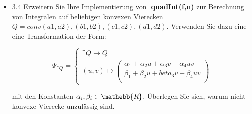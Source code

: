 \documentclass[a4paper,11pt,bibliography=totoc,listof=totoc,headinclude=true,cleardoublepage=empty,oneside]{scrbook}
\begin{document}
{\begin{itemize}
		Sei nun $ p \in \prod_{2}^k \Rightarrow \int_{\^{T}}^{} p(x,y)d(x,y) = 
		\int_{\^{Q}}^{} p(\Phi(x),\Phi(y)) * det|d\Phi| d(s,t)$ .
		
		Für $p=x^iy^j"$ lautet die Transformation wie folgt:
		
		$p(\Phi(x),\Phi(y)) = (\alpha_1+s\alpha_2+t\alpha_3+st\alpha_4)^i(\beta_1+s\beta_2+t\beta_3+st\beta_4)^j$.
			
			Aus diesem Ausdruck lesen wir heraus dass der höchste Term 
			
			$\delta_0s^it^is^jt^j = s^(i+j)t^(i+j)\delta_0$
			
			mit einer Konstanten $\delta_0$ die in diesem Fall vernachlässigt werden kann.
			
			Hingegen ist der höchste Term der Funktionaldeterminante $det|D\Phi|$:
			
			$\delta_1st$
			KORRIGIEREN, schöner SCHREIBEN
			WO FEHLT OBEN DIE TRANSFORMATION BEI DER DIE FUNKTIONALDETERMINANTE NOCH ANGEHÄNGT WERDEN MUSS
			
			Somit ist der größte Term von
			 $\int_{\^{Q}}^{} p(\Phi(x),\Phi(y)) * det|d\Phi| d(s,t)$ 
			 vom Grad
			 $\deltas^{i+j+1}t^{i+j+1}$.
			 Da $i+j+1\leq2n+1$ gefordert wird, ergibt sich $i+j\leq2n$.
			 			
			
		

		
		\item 3.4 Erweitern Sie Ihre Implementierung von \textbf{[quadInt(f,n)} zur Berechnung von Integralen auf beliebigen konvexen Vierecken $ Q=conv{(a1,a2),(b1,b2),(c1,c2),(d1,d2)} $. Verwenden Sie dazu eine eine Transformation der Form:
		
			\begin{equation} 
			\Psi_{\^{Q}} = \begin{cases} 
			\^{Q} \to Q \\
			(u,v) \mapsto
			
		 \left(
		  \begin{array}{ccc}
		  \alpha_1 + \alpha_{2}u + \alpha_{3}v +\alpha_{4}uv \\
		  \beta_1+\beta_{2}u+beta_{3}v+\beta_{4}uv \\
		  \end{array}
		  \right)

			\end{cases} 
			\end{equation} 
			
		mit den Konstanten $\alpha_i,\beta_i \in \mathebb{R}$. Überlegen Sie sich, warum nicht-konvexe Vierecke unzulässig sind.
		

\end{itemize}}
\end{document}
